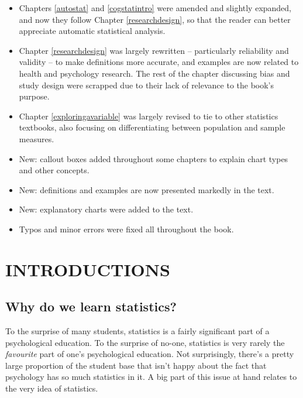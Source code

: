 \documentclass[
  11pt,
  a4paper,
  twoside,symmetric,openright]{book}
\providecommand{\tightlist}{%
  \setlength{\itemsep}{0pt}\setlength{\parskip}{0pt}}
\theoremstyle{break}
\theoremstyle{break}
\begin{document}
\begin{itemize}
\tightlist
\item
  Chapters \ref{autostat} and \ref{cogstatintro} were amended and slightly expanded, and now they follow Chapter \ref{researchdesign}, so that the reader can better appreciate automatic statistical analysis.
\item
  Chapter \ref{researchdesign} was largely rewritten -- particularly reliability and validity -- to make definitions more accurate, and examples are now related to health and psychology research. The rest of the chapter discussing bias and study design were scrapped due to their lack of relevance to the book's purpose.
\item
  Chapter \ref{exploringavariable} was largely revised to tie to other statistics textbooks, also focusing on differentiating between population and sample measures.
\item
  New: callout boxes added throughout some chapters to explain chart types and other concepts.
\item
  New: definitions and examples are now presented markedly in the text.
\item
  New: explanatory charts were added to the text.
\item
  Typos and minor errors were fixed all throughout the book.
\end{itemize}

\newpage

\setcounter{page}{1}

\part*{INTRODUCTIONS}\label{part-introductions}

\chapter{Why do we learn statistics?}\label{whywhywhy}

To the surprise of many students, statistics is a fairly significant part of a psychological education. To the surprise of no-one, statistics is very rarely the \emph{favourite} part of one's psychological education. Not surprisingly, there's a pretty large proportion of the student base that isn't happy about the fact that psychology has so much statistics in it. A big part of this issue at hand relates to the very idea of statistics.
\end{document}
